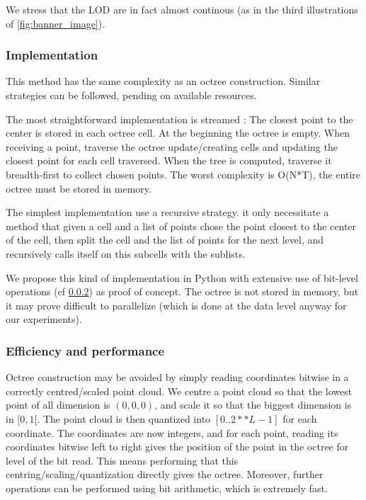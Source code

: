 			We stress that the LOD are in fact almost continous (as in the third illustrations of \ref{fig:banner_image}).
					
					
		\subsubsection{Implementation}
			
			This method has the same complexity as an octree construction. Similar strategies can be followed, pending on available resources.
			
			 
			The most straightforward implementation is streamed :
			The closest point to the center is stored in each octree cell.
			At the beginning the octree is empty. When receiving a point, traverse the octree update/creating cells and updating the closest point for each cell traversed.
			When the tree is computed, traverse it breadth-first to collect chosen points.
			The worst complexity is O(N*T), the entire octree must be stored in memory.
			
			The simplest implementation use a recursive strategy. it only necessitate a method that given a cell and a list of points chose the point closest to the center of the cell, then split the cell and the list of points for the next level, and recursively calls itself on this subcells with the sublists.
			
			We propose this kind of implementation in Python with extensive use of bit-level operations (cf \ref{subsubsec:bit_coordinates}) as proof of concept.
			The octree is not stored in memory, but it may prove difficult to parallelize (which is done at the data level anyway for our experiments). 
			
			
			
		\subsubsection{Efficiency and performance}
			\label{subsubsec:bit_coordinates}
			Octree construction may be avoided by simply reading coordinates bitwise in a correctly centred/scaled point cloud.
			We centre a point cloud so that the lowest point of all dimension is $(0,0,0)$, and scale it so that the biggest dimension is in $[0,1[$.
			The point cloud is then quantized into $[0..2**L-1]$ for each coordinate.
			The coordinates are now integers, and for each point, reading its coordinates bitwise left to right gives the position of the point in the octree for level of the bit read.
			This means performing that this centring/scaling/quantization directly gives the octree. Moreover, further operations can be performed using bit arithmetic, which is extremely fast.
			
